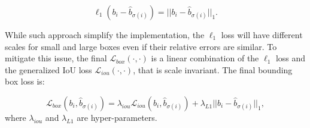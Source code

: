\begin{equation}
\ell_1(b_i - \hat b_{\sigma(i)}) = ||b_i - \hat b_{\sigma(i)}||_1.
\end{equation}

While such approach simplify the implementation, the $\ell_1$ loss will have different scales for small and large boxes even if their relative errors are similar. To mitigate this issue, the final $\mathcal{L}_{box}(\cdot, \cdot)$ is a linear combination of the $\ell_1$ loss and the generalized IoU loss \cite{generalizediou} $\mathcal{L}_{iou}(\cdot, \cdot)$, that is scale invariant. The final bounding box loss is:

\begin{equation}
\mathcal{L}_{box}(b_i, \hat b_{\sigma(i)}) = \lambda_{iou}\mathcal{L}_{iou}(b_i, \hat b_{\sigma(i)}) + \lambda_{L1}||b_i - \hat b_{\sigma(i)}||_1,
\end{equation}
where $\lambda_{iou}$ and $\lambda_{L1}$ are hyper-parameters.


